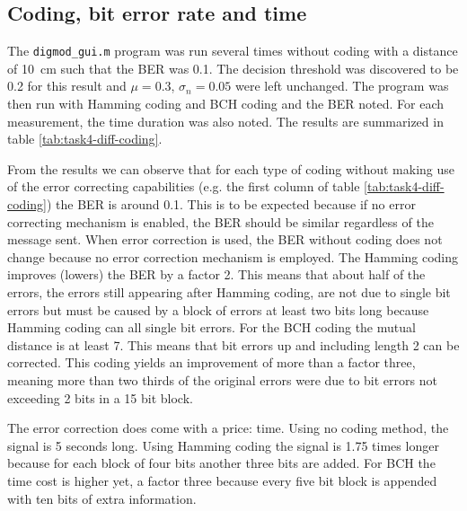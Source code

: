 \documentclass[11pt,titlepage]{report}
\begin{document}
\subsection{Coding, bit error rate and time}
The \texttt{digmod\_gui.m} program was run several times without coding with a distance of \SI{10}{\centi \meter} such that the BER was \num{0.1}. The decision threshold was discovered to be \num{0.2} for this result and $\mu=0.3$, $\sigma_n=0.05$ were left unchanged. The program was then run with Hamming coding and BCH coding and the BER noted. For each measurement, the time duration was also noted. The results are summarized in table \ref{tab:task4-diff-coding}.

From the results we can observe that for each type of coding without making use of the error correcting capabilities (e.g. the first column of table \ref{tab:task4-diff-coding}) the BER is around \num{0.1}. This is to be expected because if no error correcting mechanism is enabled, the BER should be similar regardless of the message sent. When error correction is used, the BER without coding does not change because no error correction mechanism is employed. The Hamming coding improves (lowers) the BER by a factor \num{2}. This means that about half of the errors, the errors still appearing after Hamming coding, are not due to single bit errors but must be caused by a block of errors at least two bits long because Hamming coding can all single bit errors.
For the BCH coding the mutual distance is at least \num{7}. This means that bit errors up and including length \num{2} can be corrected. This coding yields an improvement of more than a factor three, meaning more than two thirds of the original errors were due to bit errors not exceeding \num{2} bits in a \num{15} bit block.

The error correction does come with a price: time. Using no coding method, the signal is \num{5} seconds long. Using Hamming coding the signal is \num{1.75} times longer because for each block of four bits another three bits are added. For BCH the time cost is higher yet, a factor three because every five bit block is appended with ten bits of extra information.
\end{document}
